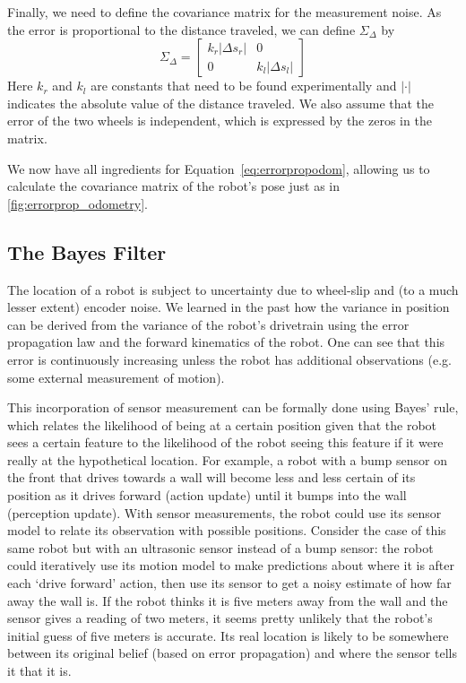 Finally, we need to define the covariance matrix for the measurement noise. As the error is proportional to the distance traveled, we can define $ \Sigma_{\Delta}$ by
\begin{equation}
\Sigma_{\Delta}=\left[\begin{array}{cc}k_r|\Delta s_r| & 0\\0 & k_l|\Delta s_l|\end{array}\right]
\end{equation}
Here $ k_r$ and $ k_l$ are constants that need to be found experimentally and $ |\cdot |$ indicates the absolute value of the distance traveled. We also assume that the error of the two wheels is independent, which is expressed by the zeros in the matrix.

We now have all ingredients for Equation~\ref{eq:errorpropodom}, allowing us to calculate the covariance matrix of the robot's pose just as in \cref{fig:errorprop_odometry}.

\subsection{The Bayes Filter}
The location of a robot is subject to uncertainty due to wheel-slip and (to a much lesser extent) encoder noise. We learned in the past how the variance in position can be derived from the variance of the robot's drivetrain using the error propagation law and the forward kinematics of the robot. One can see that this error is continuously increasing unless the robot has additional observations (e.g. some external measurement of motion).

This incorporation of sensor measurement can be formally done using Bayes' rule, which relates the likelihood of being at a certain position given that the robot sees a certain feature to the likelihood of the robot seeing this feature if it were really at the hypothetical location. For example, a robot with a bump sensor on the front that drives towards a wall will become less and less certain of its position as it drives forward (action update) until it bumps into the wall (perception update).
With sensor measurements, the robot could use its sensor model to relate its observation with possible positions. Consider the case of this same robot but with an ultrasonic sensor instead of a bump sensor: the robot could iteratively use its motion model to make predictions about where it is after each `drive forward' action, then use its sensor to get a noisy estimate of how far away the wall is. If the robot thinks it is five meters away from the wall and the sensor gives a reading of two meters, it seems pretty unlikely that the robot's initial guess of five meters is accurate.
Its real location is likely to be somewhere between its original belief (based on error propagation) and where the sensor tells it that it is.


